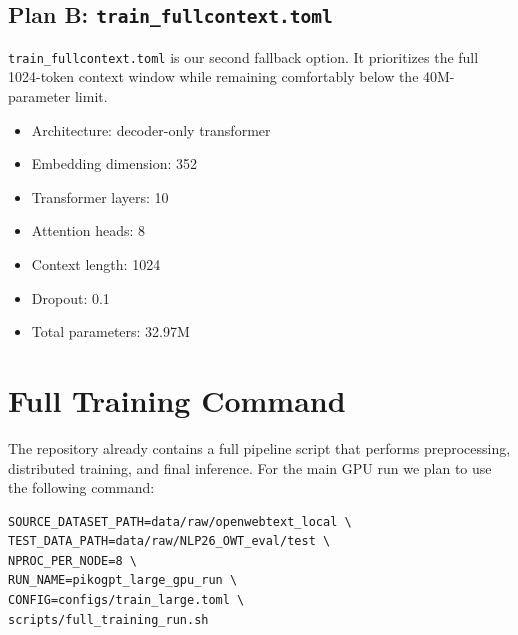 \documentclass[11pt]{article}
\begin{document}
\subsection*{Plan B: \texttt{train\_fullcontext.toml}}
\texttt{train\_fullcontext.toml} is our second fallback option. It prioritizes the full 1024-token context window while remaining comfortably below the 40M-parameter limit.

\begin{itemize}[leftmargin=1.5em]
  \item Architecture: decoder-only transformer
  \item Embedding dimension: 352
  \item Transformer layers: 10
  \item Attention heads: 8
  \item Context length: 1024
  \item Dropout: 0.1
  \item Total parameters: 32.97M
\end{itemize}

\section*{Full Training Command}
The repository already contains a full pipeline script that performs preprocessing, distributed training, and final inference. For the main GPU run we plan to use the following command:

\begin{verbatim}
SOURCE_DATASET_PATH=data/raw/openwebtext_local \
TEST_DATA_PATH=data/raw/NLP26_OWT_eval/test \
NPROC_PER_NODE=8 \
RUN_NAME=pikogpt_large_gpu_run \
CONFIG=configs/train_large.toml \
scripts/full_training_run.sh
\end{verbatim}
\end{document}
